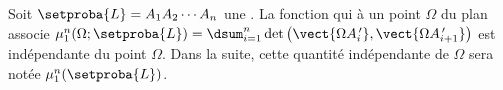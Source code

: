 %
%
%    
%    
%
%
%
%
%
%
%
%
%
%
%

\begin{fact} \label{garea-pt-ct}
    Soit $\setproba{L} = A_1 A_2 \cdots A_n$ une \nline.
    La fonction qui à un point $\Omega$ du plan associe 
    $\mu_1^n (\Omega ;\setproba{L}) = \dsum_{i=1}^{n} \det \big( \vect{\Omega A^{\,\prime}_i} , \vect{\Omega A^{\,\prime}_{i+1}} \big)$ est indépendante du point $\Omega$.
    Dans la suite, cette quantité indépendante de $\Omega$ sera notée $\mu_1^n (\setproba{L})$.
\end{fact}


